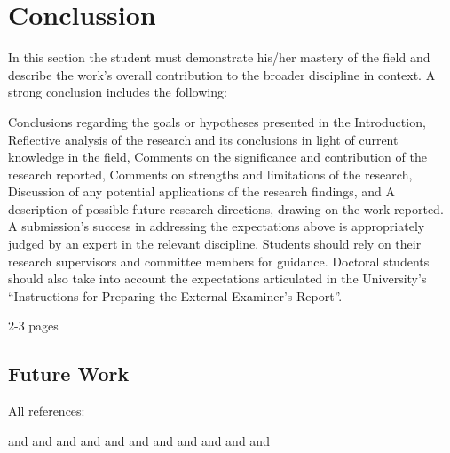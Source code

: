 \chapter{Conclussion}
\label{conclussion}

In this section the student must demonstrate his/her mastery of the field and describe the work's overall contribution to the broader discipline in context. A strong conclusion includes the following:

Conclusions regarding the goals or hypotheses presented in the Introduction,
Reflective analysis of the research and its conclusions in light of current knowledge in the field,
Comments on the significance and contribution of the research reported,
Comments on strengths and limitations of the research,
Discussion of any potential applications of the research findings, and
A description of possible future research directions, drawing on the work reported.
A submission's success in addressing the expectations above is appropriately judged by an expert in the relevant discipline. Students should rely on their research supervisors and committee members for guidance. Doctoral students should also take into account the expectations articulated in the University's “Instructions for Preparing the External Examiner's Report”.

2-3 pages

\section{Future Work}
All references:

\citep{article:01:visual} and \citep{article:02:laser} and \citep{article:03:motorsignals} and \citep{article:04:onlinelearning} and \citep{thesis:05:proprioception} and \citep{article:06:haptic} and \citep{thesis:07:proprioception} and \citep{article:08:rhex} and \citep{article:09:roughterrain} and \citep{article:10:pruningalgs} and \citep{book:11:scorpion} and \citep{thesis:12:gaitcontrol}